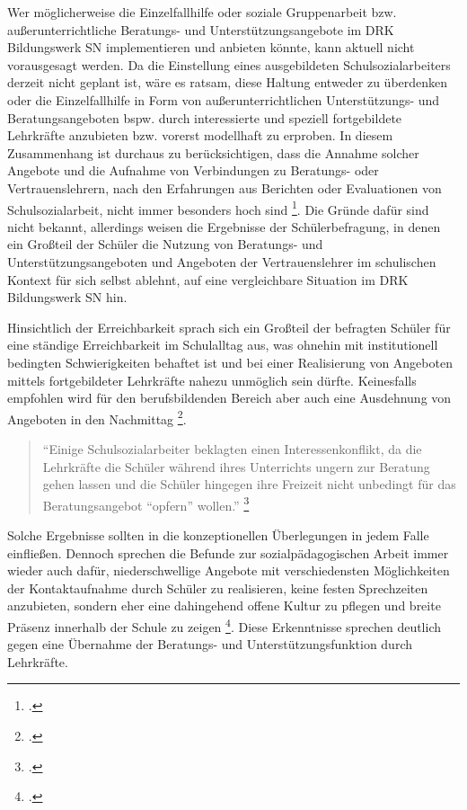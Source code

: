 Wer möglicherweise die Einzelfallhilfe oder soziale Gruppenarbeit bzw. außerunterrichtliche Beratungs- und Unterstützungsangebote im DRK Bildungswerk SN implementieren und anbieten könnte, kann aktuell nicht vorausgesagt werden. Da die Einstellung eines ausgebildeten Schulsozialarbeiters derzeit nicht geplant ist, wäre es ratsam, diese Haltung entweder zu überdenken oder die Einzelfallhilfe in Form von außerunterrichtlichen Unterstützungs- und Beratungsangeboten bspw. durch interessierte und speziell fortgebildete Lehrkräfte anzubieten bzw. vorerst modellhaft zu erproben. In diesem Zusammenhang ist durchaus zu berücksichtigen, dass die Annahme solcher Angebote und die Aufnahme von Verbindungen zu Beratungs- oder Vertrauenslehrern, nach den Erfahrungen aus Berichten oder Evaluationen von Schulsozialarbeit, nicht immer besonders hoch sind \footcite[vgl.][17f]{LSS2004}. Die Gründe dafür sind nicht bekannt, allerdings weisen die Ergebnisse der Schülerbefragung, in denen ein Großteil der Schüler die Nutzung von Beratungs- und Unterstützungsangeboten und Angeboten der Vertrauenslehrer im schulischen Kontext für sich selbst ablehnt, auf eine vergleichbare Situation im DRK Bildungswerk SN hin. 

Hinsichtlich der Erreichbarkeit sprach sich ein Großteil der  befragten Schüler für eine ständige Erreichbarkeit im Schulalltag aus, was ohnehin mit institutionell bedingten Schwierigkeiten behaftet ist und bei einer Realisierung von Angeboten mittels fortgebildeter Lehrkräfte nahezu unmöglich sein dürfte. Keinesfalls empfohlen wird für den berufsbildenden Bereich aber auch eine Ausdehnung von Angeboten in den  Nachmittag \footcite[vgl.][17f]{LSS2004}.

\begin{quotation}
\noindent
"`Einige Schulsozialarbeiter beklagten einen Interessenkonflikt, da die Lehrkräfte die Schüler während ihres Unterrichts ungern zur Beratung gehen lassen und die Schüler hingegen ihre Freizeit nicht unbedingt für das Beratungsangebot "`opfern"' wollen."' \footcite[93]{Ganser2004}
\end{quotation}

\noindent
Solche Ergebnisse sollten in die konzeptionellen Überlegungen in jedem Falle einfließen. Dennoch sprechen die Befunde zur sozialpädagogischen Arbeit immer wieder auch dafür, niederschwellige Angebote mit verschiedensten Möglichkeiten der Kontaktaufnahme durch Schüler zu realisieren, keine festen Sprechzeiten anzubieten, sondern eher eine dahingehend offene Kultur zu pflegen und breite Präsenz innerhalb der Schule zu zeigen \footcite[vgl.][48]{Essers2012}. Diese Erkenntnisse sprechen deutlich gegen eine Übernahme der Beratungs- und Unterstützungsfunktion durch Lehrkräfte.
  
